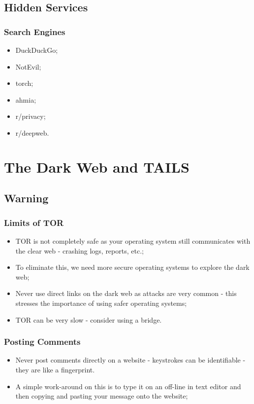 \documentclass[11pt,a4paper]{report}
\begin{document}
\section{Hidden Services}
\subsection{Search Engines}
\begin{itemize}
    \item DuckDuckGo;
    \item NotEvil;
    \item torch;
    \item ahmia;
    \item r/privacy;
    \item r/deepweb.
\end{itemize}


\chapter{The Dark Web and TAILS}
\section{Warning}
\subsection{Limits of TOR}
\begin{itemize}
    \item TOR is not completely safe as your operating system still communicates with the clear web - crashing logs, reports, etc.;
    \item To eliminate this, we need more secure operating systems to explore the dark web;
    \item Never use direct links on the dark web as attacks are very common - this stresses the importance of using safer operating systems;
    \item TOR can be very slow - consider using a bridge.
\end{itemize}
\subsection{Posting Comments}
\begin{itemize}
    \item Never post comments directly on a website - keystrokes can be identifiable - they are like a fingerprint.
    \item A simple work-around on this is to type it on an off-line in text editor and then copying and pasting your message onto the website;
\end{itemize}
\end{document}
